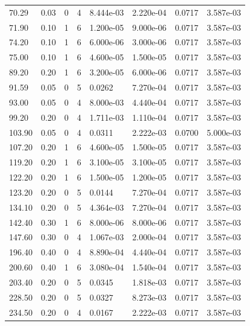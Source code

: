 \documentclass[preview]{standalone}
\begin{document}
{{\begin{tabular}{L{1.2cm}C{1.2cm} C{0.3cm}C{0.5cm} C{1.4cm}C{1.4cm} C{1.4cm}C{1.4cm}}
  70.29  &  0.03  & 0     &  4 &  8.444e-03  & 2.220e-04  & 0.0717 &  3.587e-03   \\ 
  71.90  &  0.10  & 1     &  6 &  1.200e-05  & 9.000e-06  & 0.0717 &  3.587e-03   \\ 
  74.20  &  0.10  & 1     &  6 &  6.000e-06  & 3.000e-06  & 0.0717 &  3.587e-03   \\ 
  75.00  &  0.10  & 1     &  6 &  4.600e-05  & 1.500e-05  & 0.0717 &  3.587e-03   \\ 
  89.20  &  0.20  & 1     &  6 &  3.200e-05  & 6.000e-06  & 0.0717 &  3.587e-03   \\ 
  91.59  &  0.05  & 0     &  5 &  0.0262  & 7.270e-04  & 0.0717 &  3.587e-03   \\ 
  93.00  &  0.05  & 0     &  4 &  8.000e-03  & 4.440e-04  & 0.0717 &  3.587e-03   \\ 
  99.20  &  0.20  & 0     &  4 &  1.711e-03  & 1.110e-04  & 0.0717 &  3.587e-03   \\ 
  103.90  &  0.05  & 0     &  4 &  0.0311  & 2.222e-03  & 0.0700 &  5.000e-03   \\ 
  107.20  &  0.20  & 1     &  6 &  4.600e-05  & 1.500e-05  & 0.0717 &  3.587e-03   \\ 
  119.20  &  0.20  & 1     &  6 &  3.100e-05  & 3.100e-05  & 0.0717 &  3.587e-03   \\ 
  122.20  &  0.20  & 1     &  6 &  1.500e-05  & 1.200e-05  & 0.0717 &  3.587e-03   \\ 
  123.20  &  0.20  & 0     &  5 &  0.0144  & 7.270e-04  & 0.0717 &  3.587e-03   \\ 
  134.10  &  0.20  & 0     &  5 &  4.364e-03  & 7.270e-04  & 0.0717 &  3.587e-03   \\ 
  142.40  &  0.30  & 1     &  6 &  8.000e-06  & 8.000e-06  & 0.0717 &  3.587e-03   \\ 
  147.60  &  0.30  & 0     &  4 &  1.067e-03  & 2.000e-04  & 0.0717 &  3.587e-03   \\ 
  196.40  &  0.40  & 0     &  4 &  8.890e-04  & 4.440e-04  & 0.0717 &  3.587e-03   \\ 
  200.60  &  0.40  & 1     &  6 &  3.080e-04  & 1.540e-04  & 0.0717 &  3.587e-03   \\ 
  203.40  &  0.20  & 0     &  5 &  0.0345  & 1.818e-03  & 0.0717 &  3.587e-03   \\ 
  228.50  &  0.20  & 0     &  5 &  0.0327  & 8.273e-03  & 0.0717 &  3.587e-03   \\ 
  234.50  &  0.20  & 0     &  4 &  0.0167  & 2.222e-03  & 0.0717 &  3.587e-03   \\ 

\end{tabular}}}
\end{document}
